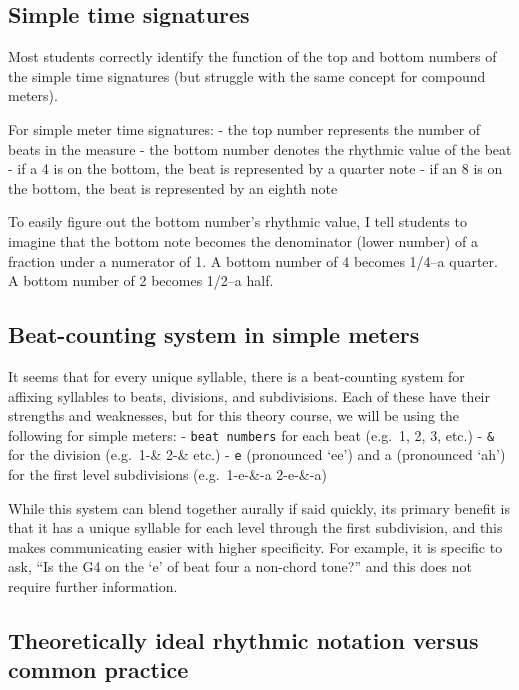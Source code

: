 \documentclass{book}
\begin{document}
\hypertarget{simple-time-signatures}{%
\subsection{Simple time signatures}\label{simple-time-signatures}}

Most students correctly identify the function of the top and bottom numbers of
the simple time signatures (but struggle with the same concept for compound
meters).

For simple meter time signatures: - the top number represents the number of
beats in the measure - the bottom number denotes the rhythmic value of the
beat - if a 4 is on the bottom, the beat is represented by a quarter note - if
an 8 is on the bottom, the beat is represented by an eighth note

To easily figure out the bottom number's rhythmic value, I tell students to
imagine that the bottom note becomes the denominator (lower number) of a
fraction under a numerator of 1. A bottom number of 4 becomes 1/4--a quarter.
A bottom number of 2 becomes 1/2--a half.

\hypertarget{beat-counting-system-in-simple-meters}{%
\subsection{Beat-counting system in simple
meters}\label{beat-counting-system-in-simple-meters}}

It seems that for every unique syllable, there is a beat-counting system for
affixing syllables to beats, divisions, and subdivisions. Each of these have
their strengths and weaknesses, but for this theory course, we will be using
the following for simple meters: - \texttt{beat\ numbers} for each beat
(e.g.~1, 2, 3, etc.) - \texttt{\&} for the division (e.g.~1-\& 2-\& etc.) -
\texttt{e} (pronounced `ee') and a (pronounced `ah') for the first level
subdivisions (e.g.~1-e-\&-a 2-e-\&-a)

While this system can blend together aurally if said quickly, its primary
benefit is that it has a unique syllable for each level through the first
subdivision, and this makes communicating easier with higher specificity. For
example, it is specific to ask, ``Is the G4 on the `e' of beat four a
non-chord tone?'' and this does not require further information.

\hypertarget{theoretically-ideal-rhythmic-notation-versus-common-practice}{%
\subsection{Theoretically ideal rhythmic notation versus common
practice}\label{theoretically-ideal-rhythmic-notation-versus-common-practice}}
\end{document}
